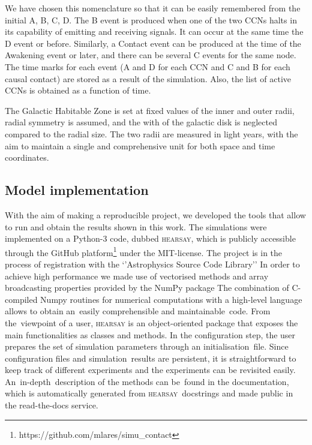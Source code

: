 \documentclass[crop]{CSLB}
\newcommand{\ceti}{CCN}
\newcommand{\cetis}{CCNs}
\newcommand{\hs}{\textsc{hearsay}}
\newcommand{\blackout}{B event }
\newcommand{\doomsday}{D event }
\newcommand{\aawakening}{Awakening event }
\newcommand{\ccontact}{Contact event }
\newcommand{\contacts}{C events }
\begin{document}
We have chosen this nomenclature so that it can be easily remembered
from the initial A, B, C, D.
%
The \blackout is produced when one of the two \cetis{} halts in its
capability of emitting and receiving signals.
%
It can occur at the same time the \doomsday or before.
%
Similarly, a \ccontact can be produced at the time of the \aawakening
or later, and there can be several \contacts for the same node.
%
The time marks for each event (A and D for each \ceti{} and C and B
for each causal contact) are stored as a result of the simulation.
%
Also, the list of active \cetis{} is obtained as a function of time.
%



The Galactic Habitable Zone is set at fixed values of the inner and outer
radii, radial symmetry is assumed, and the with of the galactic disk
is neglected compared to the radial size.
%
The two radii are measured in light years, with the aim to maintain a
single and comprehensive unit for both space and time coordinates. 
%


\subsection{Model implementation}


%
With the aim of making a reproducible project, we developed the tools
that allow to run and obtain the results shown in this work.
%
The simulations were implemented on a Python-3 code, dubbed \hs{},
which is publicly accessible through the GitHub
platform\footnote{https://github.com/mlares/simu\_contact} under the
MIT-license.
%
The project is in the process of registration with the ‘’Astrophysics
Source Code Library’’ \citep[ASCL, ][]{2015JORS....3E..15A,
2020ASPC..522..731A}
%
In order to achieve high performance we made use of vectorised methods
and array broadcasting properties provided by the NumPy package
\citep{oliphant_numpy_2006, vanderwalt_numpy_2011}
%
The combination of C-compiled Numpy routines for numerical
computations with a high-level language allows to obtain an easily
comprehensible and maintainable code.
%
From the viewpoint of a user, \hs{} is an object-oriented package that
exposes the main functionalities as classes and methods.
%
In the configuration step, the user prepares the set of simulation
parameters through an initialisation file.
%
Since configuration files and simulation results are persistent, it is
straightforward to keep track of different experiments and the
experiments can be revisited easily.
%
An in-depth description of the methods can be found in the
documentation, which is automatically generated from \hs{} docstrings
and made public in the read-the-docs service.
\end{document}
